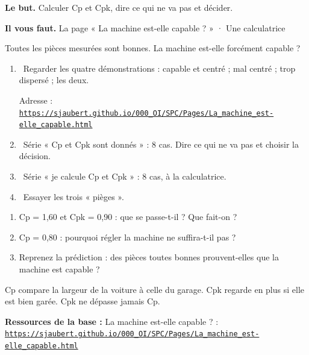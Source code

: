 \documentclass[10pt,a4paper]{article}
\begin{document}
\thispagestyle{fancy}
\begin{tcolorbox}[boite]\textbf{Le but.} Calculer Cp et Cpk, dire ce qui ne va pas et décider.\par\textbf{Il vous faut.} La page « La machine est-elle capable ? » · Une calculatrice\end{tcolorbox}
\begin{tcolorbox}[pred]Toutes les pièces mesurées sont bonnes. La machine est-elle forcément capable ?\reponse\end{tcolorbox}
\begin{enumerate}[label=\textcolor{cyan}{\textbf{\arabic*.}},leftmargin=15pt,itemsep=1.5pt]
\item \tagW\ Regarder les quatre démonstrations : capable et centré ; mal centré ; trop dispersé ; les deux.\par Adresse : \href{https://sjaubert.github.io/000_OI/SPC/Pages/La_machine_est-elle_capable.html}{\nolinkurl{https://sjaubert.github.io/000_OI/SPC/Pages/La_machine_est-elle_capable.html}}
\item \tagW\ Série « Cp et Cpk sont donnés » : 8 cas. Dire ce qui ne va pas et choisir la décision.
\item \tagW\ Série « je calcule Cp et Cpk » : 8 cas, à la calculatrice.
\item \tagW\ Essayer les trois « pièges ».
\end{enumerate}
\par
{}
\begin{enumerate}[label=\textcolor{cyan}{\textbf{Q\arabic*.}},leftmargin=22pt]
\item Cp = 1,60 et Cpk = 0,90 : que se passe-t-il ? Que fait-on ?\reponse[2]
\item Cp = 0,80 : pourquoi régler la machine ne suffira-t-il pas ?\reponse[2]
\item Reprenez la prédiction : des pièces toutes bonnes prouvent-elles que la machine est capable ?\reponse[1]
\end{enumerate}
\begin{tcolorbox}[retenir]Cp compare la largeur de la voiture à celle du garage. Cpk regarde en plus si elle est bien garée. Cpk ne dépasse jamais Cp.\end{tcolorbox}
\vfill{\footnotesize\color{uimm}\textbf{Ressources de la base :} La machine est-elle capable ? : \href{https://sjaubert.github.io/000_OI/SPC/Pages/La_machine_est-elle_capable.html}{\nolinkurl{https://sjaubert.github.io/000_OI/SPC/Pages/La_machine_est-elle_capable.html}}}
\end{document}
